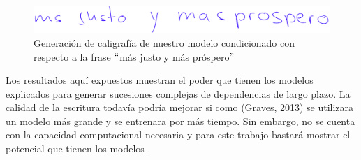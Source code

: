 \begin{figure}[h]
\begin{center}
\includegraphics[width=150mm, scale = 0.8]{./imag/mas_justo.png}
\end{center}
\caption{Generación de caligrafía de nuestro modelo condicionado con respecto a la frase $``$más justo y más próspero$"$}
\end{figure}

\vspace{1em}

Los resultados aquí expuestos muestran el poder que tienen los modelos explicados para generar sucesiones complejas de dependencias de largo plazo. La calidad de la escritura todavía podría mejorar si como (Graves, 2013) se utilizara un modelo más grande y se entrenara por más tiempo. Sin embargo, no se cuenta con la capacidad computacional necesaria y para este trabajo bastará mostrar el potencial que tienen los modelos \cite{DBLP:journals/corr/Graves13}.
